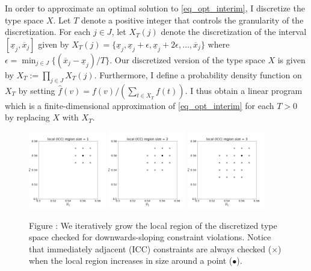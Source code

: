 \documentclass{article}
\newcounter{fig}
\begin{document}
In order to approximate an optimal solution to \ref{eq_opt_interim}, I discretize the type space $X$. Let $T$ denote a positive integer that controls the granularity of the discretization. For each $j \in J$, let $X_T(j)$ denote the discretization of the interval $[\underline{x}_j,\overline{x}_j]$ given by $X_T(j) = \{\underline{x}_j, \underline{x}_j + \epsilon, \underline{x}_j + 2\epsilon, \dots, \overline{x}_j\}$ where $\epsilon = \min_{j \in J} \{(\overline{x}_j - \underline{x}_j) / T\}$. Our discretized version of the type space $X$ is given by $X_T := \prod_{j \in J} X_T(j)$. Furthermore, I define a probability density function on $X_T$ by setting $\hat{f}(v) = f(v) / (\sum_{t \in X_T} f(t))$. I thus obtain a linear program which is a finite-dimensional approximation of \ref{eq_opt_interim} for each $T > 0$ by replacing $X$ with $X_T$.

\begin{figure}[t]
    \begin{center}
    \includegraphics[width=0.3\textwidth]{images/local_size_1.png}
    \includegraphics[width=0.3\textwidth]{images/local_size_2.png}
    \includegraphics[width=0.3\textwidth]{images/local_size_3.png}
    \end{center}
    
    \vspace{1mm}
    \raggedright{\small {\sc Figure \thefig\label{fig:sim1}:} We iteratively grow the local region of the discretized type space checked for downwards-sloping constraint violations. Notice that immediately adjacent (ICC) constraints are always checked ($\times$) when the local region increases in size around a point ($\bullet$).}
\end{figure}
\end{document}
